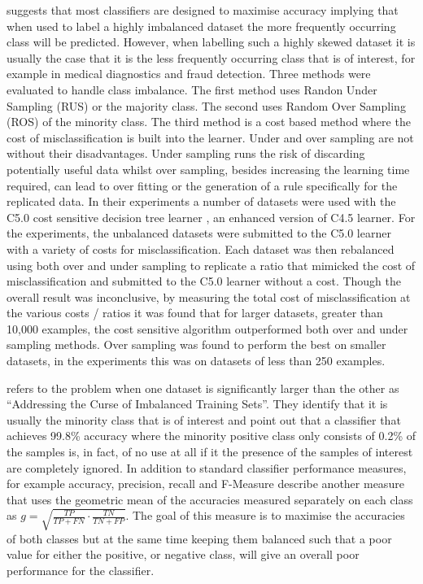 \citet{weiss_cost-sensitive_2007} suggests that most classifiers are designed to maximise accuracy implying that when used to label a highly imbalanced dataset the more frequently occurring class will be predicted. However, when labelling such a highly skewed dataset it is usually the case that it is the less frequently occurring class that is of interest, for example in medical diagnostics and fraud detection. Three methods were evaluated to handle class imbalance. The first method uses  Randon Under Sampling (RUS) or the majority class. The second uses Random Over Sampling (ROS) of the minority class. The third method is a cost based method where the cost of misclassification is built into the learner. Under and over sampling are not without their disadvantages. Under sampling runs the risk of discarding potentially useful data whilst over sampling, besides increasing the learning time required, can lead to over fitting or the generation of a rule specifically for the replicated data. In their experiments a number of datasets were used with the C5.0 cost sensitive decision tree learner \cite{rulequest_research_data_2013},  an enhanced version of C4.5 \cite{quinlan_c4.5:_1993} learner. For the experiments, the unbalanced datasets were submitted to the C5.0 learner with a variety of costs for misclassification. Each dataset was then rebalanced using both over and under sampling to replicate a ratio that mimicked the cost of misclassification and submitted to the C5.0 learner without a cost. Though the overall result was inconclusive, by measuring the total cost of misclassification at the various costs / ratios it was found that for larger datasets, greater than 10,000 examples, the cost sensitive algorithm outperformed both over and under sampling methods. Over sampling was found to perform the best on smaller datasets, in the experiments this was on datasets of less than 250 examples.

\citet{kubat_addressing_1997} refers to the problem when one dataset is significantly larger than the other as ``Addressing the Curse of Imbalanced Training Sets''. They identify that it is usually the minority class that is of interest and point out that a classifier that achieves 99.8\% accuracy where the minority positive class only consists of 0.2\% of the samples is, in fact, of no use at all if it the presence of the samples of interest are completely ignored. In addition to standard classifier performance measures, for example accuracy, precision, recall and F-Measure \citeauthor{kubat_addressing_1997} describe another measure that uses the geometric mean of the accuracies measured separately on each class as $g =\sqrt{\frac{TP}{TP + FN} \cdot \frac{TN}{TN + FP}}$. The goal of this measure is to maximise the accuracies of both classes but at the same time keeping them balanced such that a poor value for either the positive, or negative class, will give an overall poor performance for the classifier.

